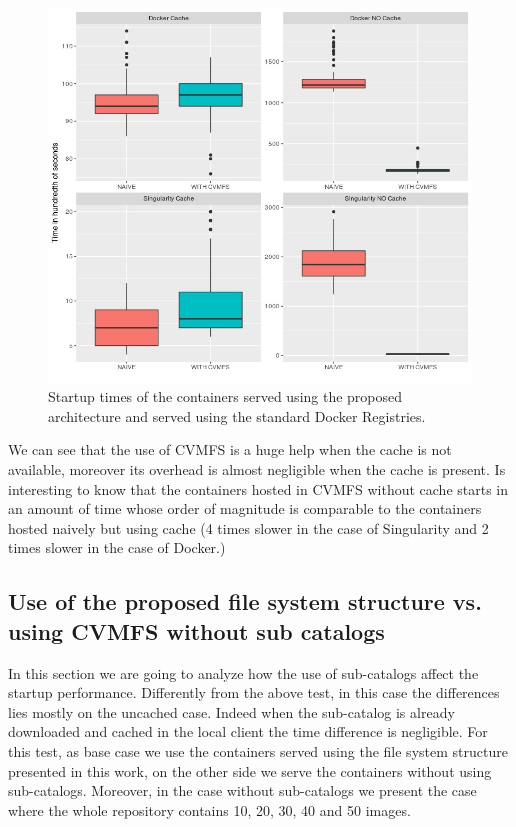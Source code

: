 \begin{figure}[]{}
    \includegraphics[width=\textwidth]{gfx/plot-startup-time}
        \caption{Startup times of the containers served using the proposed architecture and served using the standard Docker Registries.}
        \label{fig:startup-time}
\end{figure}


We can see that the use of CVMFS is a huge help when the cache is not
available, moreover its overhead is almost negligible when the cache is
present. Is interesting to know that the containers hosted in CVMFS without
cache starts in an amount of time whose order of magnitude is comparable to the
containers hosted naively but using cache (4 times slower in the case of
Singularity and 2 times slower in the case of Docker.)

\subsection{Use of the proposed file system structure vs. using CVMFS without sub catalogs}

In this section we are going to analyze how the use of sub-catalogs affect the
startup performance. Differently from the above test, in this case the
differences lies mostly on the uncached case. Indeed when the sub-catalog is
already downloaded and cached in the local client the time difference is
negligible. For this test, as base case we use the containers served using the file
system structure presented in this work, on the other side we serve the
containers without using sub-catalogs. Moreover, in the case without
sub-catalogs we present the case where the whole repository contains 10,
20, 30, 40 and 50 images.

